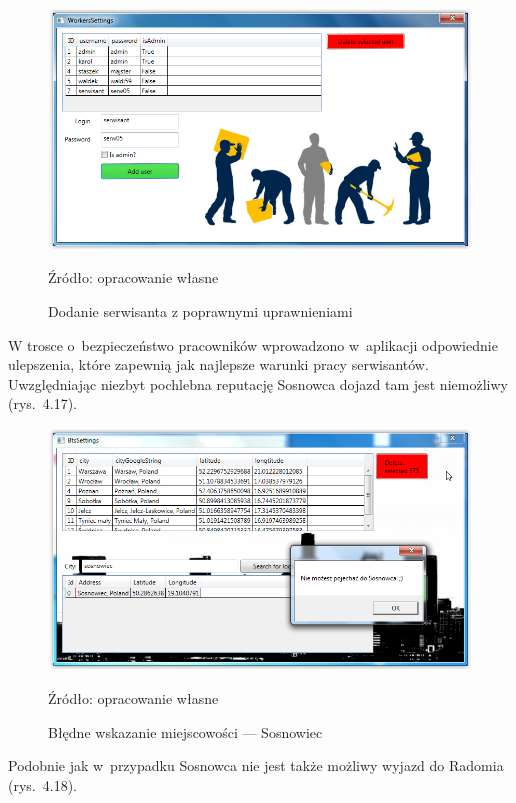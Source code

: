 \documentclass[12pt,a4paper]{report}
\begin{document}
\begin{figure}[!bht]
\centering
\includegraphics[scale=0.5]{Pictures/AddedCorrectUser.png}
\label{fig: AddedCorrectUser}
\caption{Dodanie serwisanta z poprawnymi uprawnieniami}{Źródło: opracowanie własne}
\end{figure}
\newpage
W trosce o~bezpieczeństwo pracowników wprowadzono w~aplikacji odpowiednie ulepszenia, które zapewnią jak najlepsze warunki pracy serwisantów. Uwzględniając niezbyt pochlebna reputację Sosnowca dojazd tam jest niemożliwy (rys.~4.17).

\begin{figure}[!bht]
\centering
\includegraphics[scale=0.5]{Pictures/Sosnowiec.png}
\label{fig: Sosnowiec}
\caption{Błędne wskazanie miejscowości --- Sosnowiec}{Źródło: opracowanie własne}
\end{figure}

Podobnie jak w~przypadku Sosnowca nie jest także możliwy wyjazd do Radomia (rys.~4.18).
\end{document}
